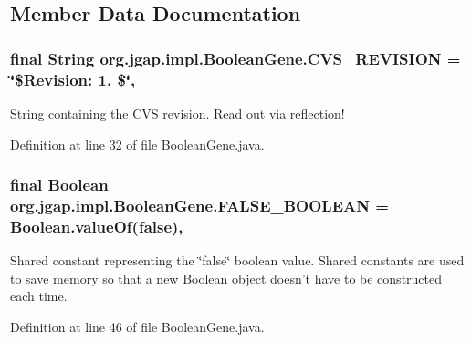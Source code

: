 \subsection{Member Data Documentation}
\hypertarget{classorg_1_1jgap_1_1impl_1_1_boolean_gene_aeef14a51d83d4580e4adb0218fc51387}{
\subsubsection[{C\-V\-S\-\_\-\-R\-E\-V\-I\-S\-I\-O\-N}]{\setlength{\rightskip}{0pt plus 5cm}final String org.\-jgap.\-impl.\-Boolean\-Gene.\-C\-V\-S\-\_\-\-R\-E\-V\-I\-S\-I\-O\-N = \char`\"{}\$Revision\-: 1. \$\char`\"{}\hspace{0.3cm}{\ttfamily [static]}, {\ttfamily [private]}}}\label{classorg_1_1jgap_1_1impl_1_1_boolean_gene_aeef14a51d83d4580e4adb0218fc51387}
String containing the C\-V\-S revision. Read out via reflection! 

Definition at line 32 of file Boolean\-Gene.\-java.

\hypertarget{classorg_1_1jgap_1_1impl_1_1_boolean_gene_ad70a1308d2e7b7872660808d59ca3332}{
\subsubsection[{F\-A\-L\-S\-E\-\_\-\-B\-O\-O\-L\-E\-A\-N}]{\setlength{\rightskip}{0pt plus 5cm}final Boolean org.\-jgap.\-impl.\-Boolean\-Gene.\-F\-A\-L\-S\-E\-\_\-\-B\-O\-O\-L\-E\-A\-N = Boolean.\-value\-Of(false)\hspace{0.3cm}{\ttfamily [static]}, {\ttfamily [protected]}}}\label{classorg_1_1jgap_1_1impl_1_1_boolean_gene_ad70a1308d2e7b7872660808d59ca3332}
Shared constant representing the \char`\"{}false\char`\"{} boolean value. Shared constants are used to save memory so that a new Boolean object doesn't have to be constructed each time. 

Definition at line 46 of file Boolean\-Gene.\-java.



